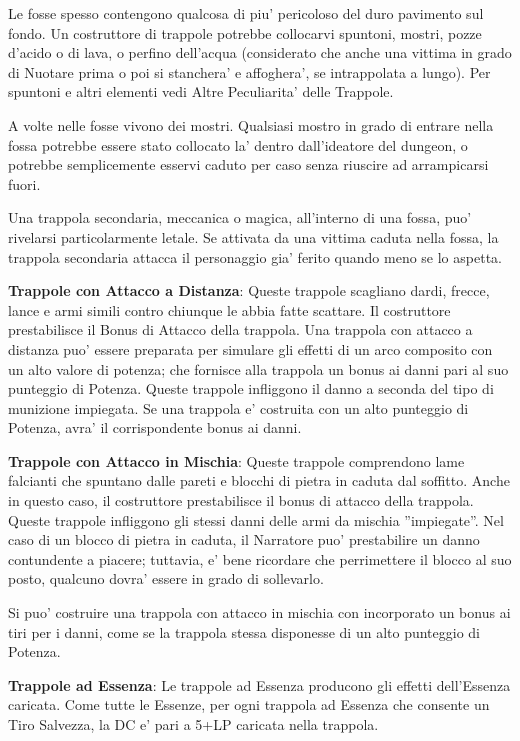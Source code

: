 \documentclass[a4paper,11pt,twoside,openany]{book}
\begin{document}
{Le fosse spesso contengono qualcosa di piu' pericoloso del duro pavimento sul fondo. Un costruttore di trappole potrebbe collocarvi spuntoni, mostri, pozze d'acido o di lava, o perfino dell'acqua (considerato che anche una vittima in grado di Nuotare prima o poi si stanchera' e affoghera', se intrappolata a lungo). Per spuntoni e altri elementi vedi Altre Peculiarita' delle Trappole.

A volte nelle fosse vivono dei mostri. Qualsiasi mostro in grado di entrare nella fossa potrebbe essere stato collocato la' dentro dall'ideatore del dungeon, o potrebbe semplicemente esservi caduto per caso senza riuscire ad arrampicarsi fuori.

Una trappola secondaria, meccanica o magica, all'interno di una fossa, puo' rivelarsi particolarmente letale. Se attivata da una vittima caduta nella fossa, la trappola secondaria attacca il personaggio gia' ferito quando meno se lo aspetta.

\textbf{Trappole con Attacco a Distanza}: Queste trappole scagliano dardi, frecce, lance e armi simili contro chiunque le abbia fatte scattare. Il costruttore prestabilisce il Bonus di Attacco della trappola. Una trappola con attacco a distanza puo' essere preparata per simulare gli effetti di un arco composito con un alto valore di potenza; che fornisce alla trappola un bonus ai danni pari al suo punteggio di Potenza. Queste trappole infliggono il danno a seconda del tipo di munizione impiegata. Se una trappola e' costruita con un alto punteggio di Potenza, avra' il corrispondente bonus ai danni.

\textbf{Trappole con Attacco in Mischia}: Queste trappole comprendono lame falcianti che spuntano dalle pareti e blocchi di pietra in caduta dal soffitto. Anche in questo caso, il costruttore prestabilisce il bonus di attacco della trappola. Queste trappole infliggono gli stessi danni delle armi da mischia ''impiegate''. Nel caso di un blocco di pietra in caduta, il Narratore puo' prestabilire un danno contundente a piacere; tuttavia, e' bene ricordare che perrimettere il blocco al suo posto, qualcuno dovra' essere in grado di sollevarlo.

Si puo' costruire una trappola con attacco in mischia con incorporato un bonus ai tiri per i danni, come se la trappola stessa disponesse di un alto punteggio di Potenza.

\textbf{Trappole ad Essenza}: Le trappole ad Essenza producono gli effetti dell'Essenza caricata. Come tutte le Essenze, per ogni trappola ad Essenza che consente un Tiro Salvezza, la DC e' pari a 5+LP caricata nella trappola.

}
\end{document}
